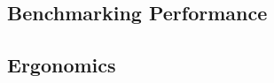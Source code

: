 \subsection*{Benchmarking Performance}\label{ssec:benchmarking-performance}



\subsection*{Ergonomics}\label{ssec:ergonomics}




%
%



